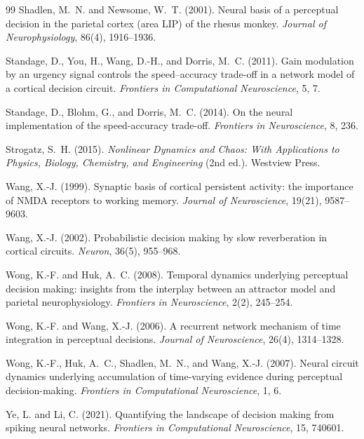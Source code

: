 \documentclass[11pt]{article}
\begin{document}
\begin{thebibliography}{99}
		Shadlen, M.~N. and Newsome, W.~T. (2001).
		Neural basis of a perceptual decision in the parietal cortex (area LIP) of the rhesus monkey.
		\textit{Journal of Neurophysiology}, 86(4), 1916--1936.
		
		Standage, D., You, H., Wang, D.-H., and Dorris, M.~C. (2011).
		Gain modulation by an urgency signal controls the speed--accuracy trade-off in a network model of a cortical decision circuit.
		\textit{Frontiers in Computational Neuroscience}, 5, 7.
		
		Standage, D., Blohm, G., and Dorris, M.~C. (2014).
		On the neural implementation of the speed-accuracy trade-off.
		\textit{Frontiers in Neuroscience}, 8, 236.
		
		Strogatz, S.~H. (2015).
		\textit{Nonlinear Dynamics and Chaos: With Applications to Physics, Biology, Chemistry, and Engineering} (2nd ed.).
		Westview Press.
		
		Wang, X.-J. (1999).
		Synaptic basis of cortical persistent activity: the importance of NMDA receptors to working memory.
		\textit{Journal of Neuroscience}, 19(21), 9587--9603.
		
		Wang, X.-J. (2002).
		Probabilistic decision making by slow reverberation in cortical circuits.
		\textit{Neuron}, 36(5), 955--968.
		
		Wong, K.-F. and Huk, A.~C. (2008).
		Temporal dynamics underlying perceptual decision making: insights from the interplay between an attractor model and parietal neurophysiology.
		\textit{Frontiers in Neuroscience}, 2(2), 245--254.
		
		Wong, K.-F. and Wang, X.-J. (2006).
		A recurrent network mechanism of time integration in perceptual decisions.
		\textit{Journal of Neuroscience}, 26(4), 1314--1328.
		
		Wong, K.-F., Huk, A.~C., Shadlen, M.~N., and Wang, X.-J. (2007).
		Neural circuit dynamics underlying accumulation of time-varying evidence during perceptual decision-making.
		\textit{Frontiers in Computational Neuroscience}, 1, 6.
		
		Ye, L. and Li, C. (2021).
		Quantifying the landscape of decision making from spiking neural networks.
		\textit{Frontiers in Computational Neuroscience}, 15, 740601.
	\end{thebibliography}
\end{document}
